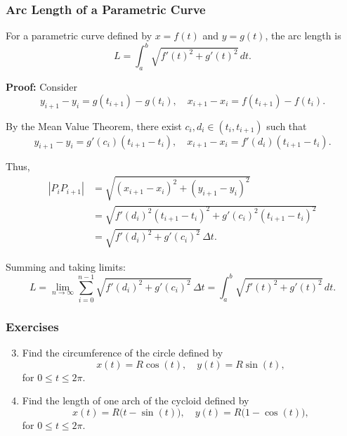 \subsubsection{Arc Length of a Parametric Curve}
\label{sss:arcl-cc81}

For a parametric curve defined by $x=f(t)$ and $y=g(t)$, the arc length is
\[
L = \int_a^b \sqrt{f'(t)^2 + g'(t)^2}\,dt.
\]

\textbf{Proof:} Consider
\[
y_{i+1} - y_i = g(t_{i+1}) - g(t_i), \quad 
x_{i+1} - x_i = f(t_{i+1}) - f(t_i).
\]

By the Mean Value Theorem, there exist $c_i, d_i \in (t_i, t_{i+1})$ such that
\[
y_{i+1} - y_i = g'(c_i)(t_{i+1} - t_i), \quad
x_{i+1} - x_i = f'(d_i)(t_{i+1} - t_i).
\]

Thus,
\begin{align}
|P_i P_{i+1}|
&= \sqrt{(x_{i+1}-x_i)^2 + (y_{i+1}-y_i)^2} \\
&= \sqrt{f'(d_i)^2 (t_{i+1}-t_i)^2 + g'(c_i)^2 (t_{i+1}-t_i)^2} \\
&= \sqrt{f'(d_i)^2 + g'(c_i)^2}\,\Delta t.
\end{align}

Summing and taking limits:
\[
L = \lim_{n\to\infty} \sum_{i=0}^{n-1} 
\sqrt{f'(d_i)^2 + g'(c_i)^2}\,\Delta t
= \int_a^b \sqrt{f'(t)^2 + g'(t)^2}\,dt.
\]

\subsubsection{Exercises}
\label{sss:exer-parametric}

\begin{enumerate}
\setcounter{enumi}{2}

\item Find the circumference of the circle defined by
\[
x(t) = R\cos(t), \quad y(t) = R\sin(t),
\]
for $0 \le t \le 2\pi$.

\item Find the length of one arch of the cycloid defined by
\[
x(t) = R\bigl(t - \sin(t)\bigr), \quad
y(t) = R\bigl(1 - \cos(t)\bigr),
\]
for $0 \le t \le 2\pi$.
\end{enumerate}

